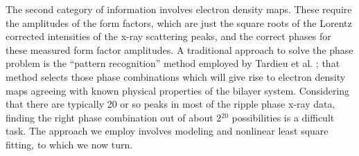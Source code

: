 The second category of information involves electron density maps.  These
require the amplitudes of the form factors, which are just
the square roots of the Lorentz corrected intensities of the x-ray scattering peaks,
and the correct phases for these measured form factor amplitudes.
A traditional approach to solve the phase problem is the ``pattern recognition''
method employed by Tardieu et al. \cite{Tar73}; that method
selects those phase combinations which will give rise to electron density maps 
agreeing with known physical properties of the bilayer system.
Considering that there are typically 20 or so 
peaks in most of the ripple phase x-ray data, finding the right phase 
combination out of about 2$^{20}$ possibilities is a difficult task. 
The approach we employ involves modeling and nonlinear least square fitting, to 
which we now turn.

